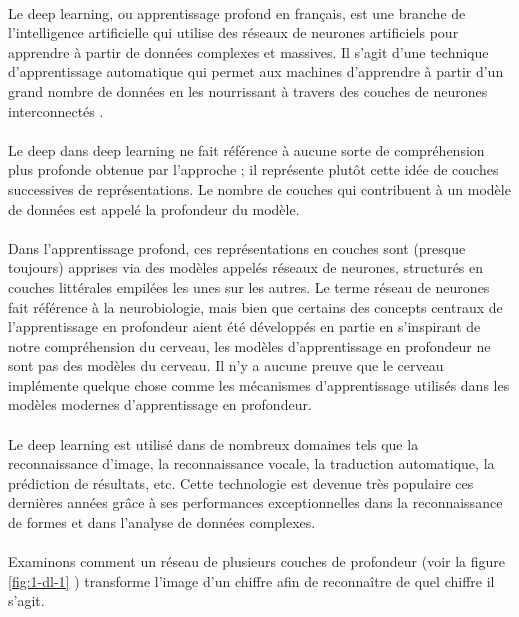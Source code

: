 \paragraph{}Le deep learning, ou apprentissage profond en français, est une branche de l'intelligence artificielle qui utilise des réseaux de neurones artificiels pour apprendre à partir de données complexes et massives. Il s'agit d'une technique d'apprentissage automatique qui permet aux machines d'apprendre à partir d'un grand nombre de données en les nourrissant à travers des couches de neurones interconnectés \cite{dlp}. 
\paragraph{}Le deep dans  deep learning ne fait référence à aucune sorte de compréhension plus profonde obtenue par l'approche ; il représente plutôt cette idée de couches successives de représentations. Le nombre de couches qui contribuent à un modèle de données est appelé la profondeur du modèle. 
\paragraph{}Dans l'apprentissage profond, ces représentations en couches sont (presque toujours) apprises via des modèles appelés réseaux de neurones, structurés en couches littérales empilées les unes sur les autres. Le terme réseau de neurones fait référence à la neurobiologie, mais bien que certains des concepts centraux de l'apprentissage en profondeur aient été développés en partie en s'inspirant de notre compréhension du cerveau, les modèles d'apprentissage en profondeur ne sont pas des modèles du cerveau. Il n'y a aucune preuve que le cerveau implémente quelque chose comme les mécanismes d'apprentissage utilisés dans les modèles modernes d'apprentissage en profondeur. 
\paragraph{}Le deep learning est utilisé dans de nombreux domaines tels que la reconnaissance d'image, la reconnaissance vocale, la traduction automatique, la prédiction de résultats, etc. Cette technologie est devenue très populaire ces dernières années grâce à ses performances exceptionnelles dans la reconnaissance de formes et dans l'analyse de données complexes.
\paragraph{}Examinons comment un réseau de plusieurs couches de profondeur (voir la figure \ref{fig:1-dl-1} ) transforme l'image d'un chiffre afin de reconnaître de quel chiffre il s'agit.

